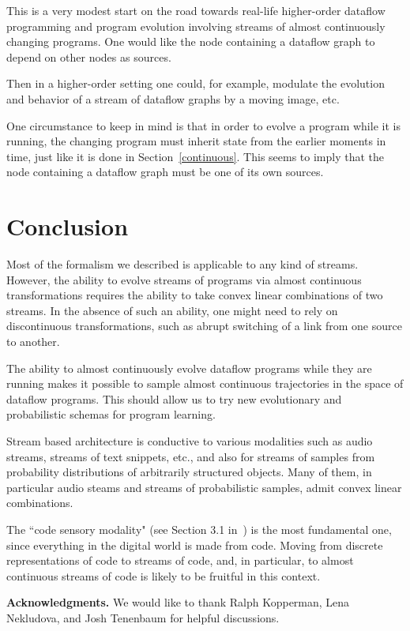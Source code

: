 \documentclass{llncs}
\begin{document}
This is a very modest start on the road towards real-life higher-order dataflow programming and program evolution
involving streams of almost continuously changing programs. One would like the node containing a dataflow graph
to depend on other nodes as sources.

Then in a higher-order setting one could, for example, modulate the evolution and behavior of a stream of dataflow graphs by a moving image, etc.

One circumstance to keep in mind is that in order to evolve a program while it is running, the changing program must inherit state from the earlier
moments in time, just like it is done in Section~\ref{continuous}. This seems to imply that the node containing a dataflow graph must be one of
its own sources.

\section{Conclusion}

Most of the formalism we described is applicable to any kind of streams. However, the ability to evolve streams of programs via almost continuous
transformations requires the ability to take convex linear combinations of two streams. In the absence of such an ability, one might need
to rely on discontinuous transformations, such as abrupt switching of a link from one source to another.

The ability to almost continuously evolve dataflow programs while they are running makes it possible
to sample almost continuous trajectories in the space of dataflow programs. This should allow us to try new evolutionary and
probabilistic schemas for
program learning.


Stream based architecture is conductive to various modalities such as audio streams, streams of text snippets, etc., and also for
streams of samples from probability distributions of arbitrarily structured objects. Many of them, in particular audio steams and
streams of probabilistic samples, admit convex linear combinations.

The ``code sensory modality" (see Section 3.1 in~\cite{EYudkowsky})
is the most fundamental one, since everything in the digital world is made from code. Moving from discrete
representations of code to streams of code, and, in particular, to almost continuous streams of code is likely to be fruitful
in this context.

{\bf Acknowledgments.} We would like to thank Ralph Kopperman, Lena Nekludova, and Josh Tenenbaum for helpful discussions.
\end{document}
